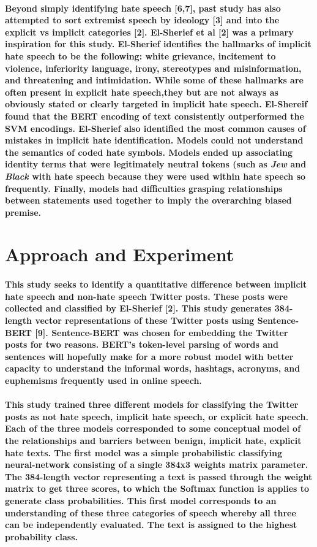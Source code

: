 \documentclass{article}
\begin{document}
\paragraph{Beyond simply identifying hate speech [6,7], past study has also attempted to sort extremist speech by ideology [3] and into the explicit vs implicit categories [2]. El-Sherief et al [2] was a primary inspiration for this study. El-Sherief identifies the hallmarks of implicit hate speech to be the following: white grievance, incitement to violence, inferiority language, irony, stereotypes and misinformation, and threatening and intimidation. While some of these hallmarks are often present in explicit hate speech,they but are not always as obviously stated or clearly targeted in implicit hate speech. El-Shereif found that the BERT encoding of text consistently outperformed the SVM encodings. El-Sherief also identified the most common causes of mistakes in implicit hate identification. Models could not understand the semantics of coded hate symbols. Models ended up associating identity terms that were legitimately neutral tokens (such as \textit{Jew} and \textit{Black} with hate speech because they were used within hate speech so frequently. Finally, models had difficulties grasping relationships between statements used together to imply the overarching biased premise.}
\section{Approach and Experiment}
\paragraph{This study seeks to identify a quantitative difference between implicit hate speech and non-hate speech Twitter posts. These posts were collected and classified by El-Sherief [2]. This study generates 384-length vector representations of these Twitter posts using Sentence-BERT [9]. Sentence-BERT was chosen for embedding the Twitter posts for two reasons. BERT's token-level parsing of words and sentences will hopefully make for a more robust model with better capacity to understand the informal words, hashtags, acronyms, and euphemisms frequently used in online speech.}
\paragraph{This study trained three different models for classifying the Twitter posts as not hate speech, implicit hate speech, or explicit hate speech. Each of the three models corresponded to some conceptual model of the relationships and barriers between benign, implicit hate, explicit hate texts. The first model was a simple probabilistic classifying neural-network consisting of a single 384x3 weights matrix parameter. The 384-length vector representing a text is passed through the weight matrix to get three scores, to which the Softmax function is applies to generate class probabilities. This first model corresponds to an understanding of these three categories of speech whereby all three can be independently evaluated. The text is assigned to the highest probability class.}
\end{document}
